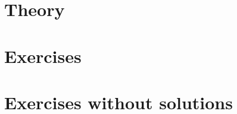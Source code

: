 \documentclass[11pt]{report}
\begin{document}
\part{Theory}
\def\slides{slides/01_intro.pdf}


\def\slides{slides/02_crypto.pdf}


\def\slides{slides/03_authN.pdf}


\def\slides{slides/04_netsec_p1.pdf}


\def\slides{slides/05_firewall.pdf}


\def\slides{slides/06_netsec_p2.pdf}


\def\slides{slides/07_schannels.pdf}


\setcounter{chapter}{8} %


\part{Exercises}

\setcounter{chapter}{20}








\part{Exercises without solutions}
\setcounter{chapter}{30}








\appendix
%



\end{document}
